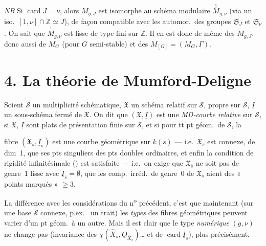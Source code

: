 \documentclass[11pt,a4paper]{article}
\begin{document}
\emph{NB} Si $\operatorname{card} J = \nu$, alors $M_{g,J}$ est isomorphe au schéma modulaire $\overset{!}{M}_{g,\nu}$ (via un iso.\ $[1,\nu] \cap \mathbb{Z} \simeq J$), de façon compatible avec les automor.\ des groupes $\mathfrak{S}_J$ et $\mathfrak{S}_\nu$. On sait que $\overset{!}{M}_{g,\nu}$ est lisse de type fini sur $\mathbb{Z}$. Il en est donc de même des $M_{g,J}$, donc aussi de $M_G$ (pour $G$ semi-stable) et des $M_{[G]} = (M_G, \Gamma)$.

\section{4. La théorie de Mumford-Deligne}

Soient $\mathcal{S}$ un multiplicité schématique, $\mathfrak{X}$ un  schéma relatif sur $\mathcal{S}$, propre sur $\mathcal{S}$, $\underline{I}$ un sous-schéma fermé de $\mathfrak{X}$. On dit que $(\mathfrak{X}, \underline{I})$ est une \emph{MD-courbe relative} sur $\mathcal{S}$, si $\mathfrak{X}$, $\underline{I}$ sont plats de présentation finie sur $\mathcal{S}$, et si pour tt pt géom.\ de $\mathcal{S}$, la

fibre $(\mathfrak{X}_{\bar{s}}, \underline{I}_{\bar{s}})$ est une courbe géométrique sur $k(s)$ --- i.e.\ $\mathfrak{X}_{\bar{s}}$ est connexe, de dim~1,  que ses pts singuliers  des pts doubles ordinaires, et enfin la condition de rigidité infinitésimale (\ill{}) est satisfaite ---  i.e.\ on exige que $\mathfrak{X}_{\bar{s}}$ ne soit pas de genre~1 lisse avec $\underline{I}_{\bar{s}} = \emptyset$,  que les comp.\ irréd.\ de genre~0 de $\mathfrak{X}_{\bar{s}}$ aient des « points marqués » $\geqslant 3$.

La différence avec les considérations du n\textsuperscript{o} précédent, c'est que maintenant (sur une base $\mathcal{S}$ connexe, p.ex.\ \struck{\ill{}} un trait) les \emph{types} des fibres géométriques peuvent varier d'un pt géom.\ à un autre. Mais il est clair que le type \emph{numérique} $(g,\nu)$ ne change pas (invariance des $\chi(\hat{X}_s, \underline{O}_{\hat{X}_s})$… et de $\operatorname{card} \underline{I}_s$), plus précisément,
\end{document}
